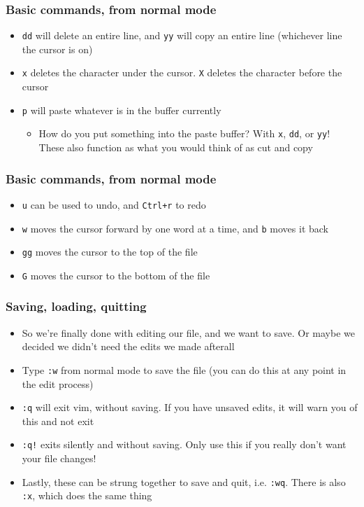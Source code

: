 \documentclass{beamer}
\begin{document}
\begin{frame}
    \frametitle{Basic commands, from normal mode}
    \begin{itemize}
        \item \texttt{dd} will delete an entire line, and \texttt{yy} will copy an entire line (whichever line the cursor is on)
        \item \texttt{x} deletes the character under the cursor. \texttt{X} deletes the character before the cursor
        \pause
        \item \texttt{p} will paste whatever is in the buffer currently
        \begin{itemize}
            \item How do you put something into the paste buffer? With \texttt{x}, \texttt{dd}, or \texttt{yy}! These also function as what you would think of as cut and copy
        \end{itemize}
    \end{itemize}
\end{frame}

\begin{frame}
    \frametitle{Basic commands, from normal mode}
    \begin{itemize}
        \item \texttt{u} can be used to undo, and \texttt{Ctrl+r} to redo
        \pause
        \item \texttt{w} moves the cursor forward by one word at a time, and \texttt{b} moves it back
        \pause
        \item \texttt{gg} moves the cursor to the top of the file
        \item \texttt{G} moves the cursor to the bottom of the file
    \end{itemize}
\end{frame}

\begin{frame}
    \frametitle{Saving, loading, quitting}
    \pause
    \begin{itemize}
        \item So we're finally done with editing our file, and we want to save. Or maybe we decided we didn't need the edits we made afterall
        \pause
        \item Type \texttt{:w} from normal mode to save the file (you can do this at any point in the edit process)
        \item \texttt{:q} will exit vim, without saving. If you have unsaved edits, it will warn you of this and not exit
        \item \texttt{:q!} exits silently and without saving. Only use this if you really don't want your file changes!
        \item Lastly, these can be strung together to save and quit, i.e. \texttt{:wq}. There is also \texttt{:x}, which does the same thing
    \end{itemize}
\end{frame}
\end{document}
